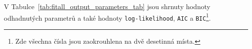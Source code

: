 \documentclass[a4, 11pt]{article}
\theoremstyle{definition}
\theoremstyle{remark}
\begin{document}
	V Tabulce~\ref{tab:fitall_output_parameters_tab} jsou shrnuty hodnoty odhadnutých parametrů a také hodnoty \texttt{log-likelihood}, \texttt{AIC} a \texttt{BIC}\footnote{Zde všechna čísla jsou zaokrouhlena na dvě desetinná místa.}.
	
\end{document}
